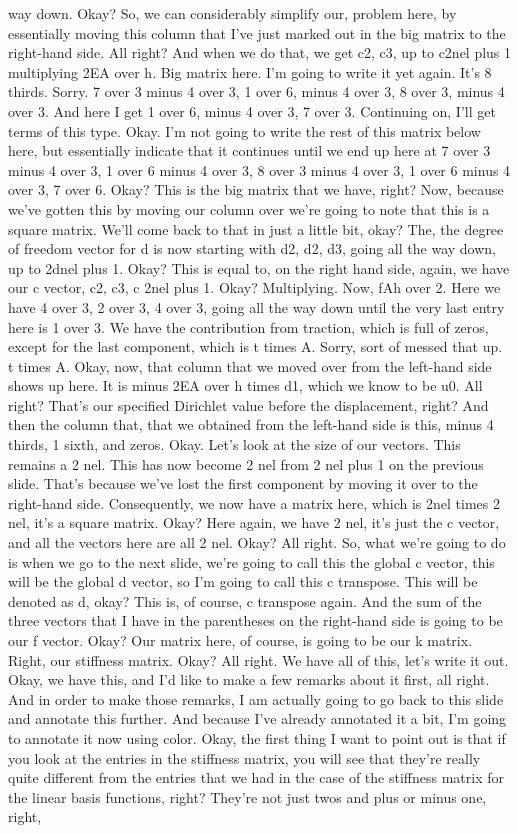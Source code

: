 \documentclass[10pt]{article}
\begin{document}
{way down. Okay? So, we can considerably simplify our, problem here, by essentially moving this column that I've just marked out in the big matrix to the right-hand side. All right? And when we do that, we get c2, c3, up to c2nel plus 1 multiplying 2EA over h. Big matrix here. I'm going to write it yet again. It's 8 thirds. Sorry. 7 over 3 minus 4 over 3, 1 over 6, minus 4 over 3, 8 over 3, minus 4 over 3. And here I get 1 over 6, minus 4 over 3, 7 over 3. Continuing on, I'll get terms of this type. Okay. I'm not going to write the rest of this matrix below here, but essentially indicate that it continues until we end up here at 7 over 3 minus 4 over 3, 1 over 6 minus 4 over 3, 8 over 3 minus 4 over 3, 1 over 6 minus 4 over 3, 7 over 6. Okay? This is the big matrix that we have, right? Now, because we've gotten this by moving our column over we're going to note that this is a square matrix. We'll come back to that in just a little bit, okay? The, the degree of freedom vector for d is now starting with d2, d2, d3, going all the way down, up to 2dnel plus 1. Okay? This is equal to, on the right hand side, again, we have our c vector, c2, c3, c 2nel plus 1. Okay? Multiplying. Now, fAh over 2. Here we have 4 over 3, 2 over 3, 4 over 3, going all the way down until the very last entry here is 1 over 3. We have the contribution from traction, which is full of zeros, except for the last component, which is t times A. Sorry, sort of messed that up. t times A. Okay, now, that column that we moved over from the left-hand side shows up here. It is minus 2EA over h times d1, which we know to be u0. All right? That's our specified Dirichlet value before the displacement, right? And then the column that, that we obtained from the left-hand side is this, minus 4 thirds, 1 sixth, and zeros. Okay. Let's look at the size of our vectors. This remains a 2 nel. This has now become 2 nel from 2 nel plus 1 on the previous slide. That's because we've lost the first component by moving it over to the right-hand side. Consequently, we now have a matrix here, which is 2nel times 2 nel, it's a square matrix. Okay? Here again, we have 2 nel, it's just the c vector, and all the vectors here are all 2 nel. Okay? All right. So, what we're going to do is when we go to the next slide, we're going to call this the global c vector, this will be the global d vector, so I'm going to call this c transpose. This will be denoted as d, okay? This is, of course, c transpose again. And the sum of the three vectors that I have in the parentheses on the right-hand side is going to be our f vector. Okay? Our matrix here, of course, is going to be our k matrix. Right, our stiffness matrix. Okay? All right. We have all of this, let's write it out. Okay, we have this, and I'd like to make a few remarks about it first, all right. And in order to make those remarks, I am actually going to go back to this slide and annotate this further. And because I've already annotated it a bit, I'm going to annotate it now using color. Okay, the first thing I want to point out is that if you look at the entries in the stiffness matrix, you will see that they're really quite different from the entries that we had in the case of the stiffness matrix for the linear basis functions, right? They're not just twos and plus or minus one, right, }
\end{document}
